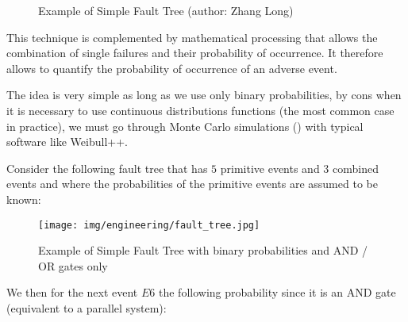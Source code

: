 \begin{figure}[H]
		\caption[Example of Simple Fault Tree]{Example of Simple Fault Tree (author: Zhang Long)}
	\end{figure}
	This technique is complemented by mathematical processing that allows the combination of single failures and their probability of occurrence. It therefore allows to quantify the probability of occurrence of an adverse event.
	
	The idea is very simple as long as we use only binary probabilities, by cons when it is necessary to use continuous distributions functions (the most common case in practice), we must go through Monte Carlo simulations () with typical software like Weibull++.
	
	Consider the following fault tree that has $5$ primitive events and $3$ combined events and where the probabilities of the primitive events are assumed to be known:
	\begin{figure}[H]
		\begin{center}
		\texttt{[image: img/engineering/fault\_tree.jpg]}
		\end{center}	
		\caption{Example of Simple Fault Tree with binary probabilities and AND / OR gates only}
	\end{figure}
	We then for the next event $E6$ the following probability since it is an AND gate (equivalent to a parallel system):
	

